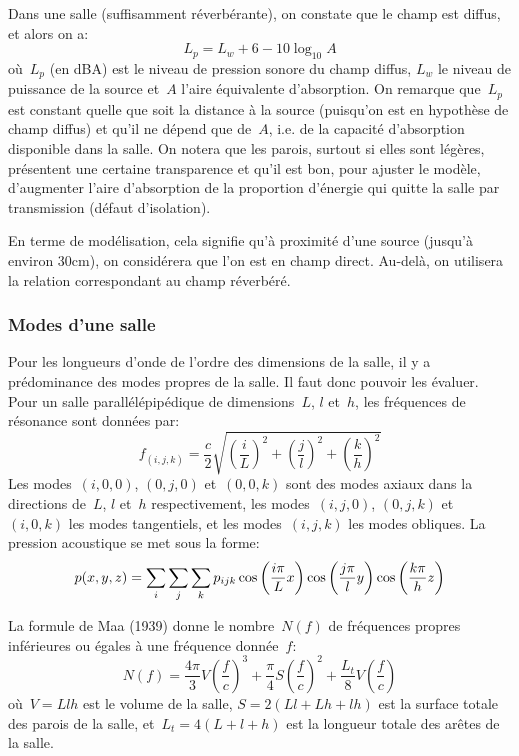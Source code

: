 \medskip
Dans une salle (suffisamment réverbérante), on constate que le champ est diffus, et alors on a:
\begin{equation}
L_p = L_w + 6 - 10\log_{10} A
\end{equation}
où~$L_p$ (en dBA) est le niveau de pression sonore du champ diffus, $L_w$ le niveau de puissance de la source et~$A$ l'aire équivalente d'absorption.
On remarque que~$L_p$ est constant quelle que soit la distance à la source (puisqu'on est en hypothèse de champ diffus) et qu'il ne dépend que de~$A$, i.e. de la capacité d'absorption disponible dans la salle.
On notera que les parois, surtout si elles sont légères, présentent une certaine transparence et qu'il est bon, pour ajuster le modèle, d'augmenter l'aire d'absorption de la proportion d'énergie qui quitte la salle par transmission (défaut d'isolation).

\medskip
En terme de modélisation, cela signifie qu'à proximité d'une source (jusqu'à environ 30cm), on considérera que l'on est en champ direct. Au-delà, on utilisera la relation correspondant au champ réverbéré.



\medskip
\subsubsection{Modes d'une salle}

Pour les longueurs d'onde de l'ordre des dimensions de la salle, il y a prédominance des modes propres de la salle. Il faut donc pouvoir les évaluer.
Pour un salle parallélépipédique de dimensions~$L$, $l$ et~$h$, les fréquences de résonance sont données par:
\begin{equation}
f_{(i,j,k)} = \frac{c}2\sqrt{\left(\frac{i}{L}\right)^2+\left(\frac{j}{l}\right)^2+\left(\frac{k}{h}\right)^2}
\end{equation}
Les modes~$(i,0,0)$, $(0,j,0)$ et~$(0,0,k)$ sont des modes axiaux dans la directions de~$L$, $l$ et~$h$ respectivement, les modes~$(i,j,0)$, $(0,j,k)$ et~$(i,0,k)$ les modes tangentiels, et les modes~$(i,j,k)$ les modes obliques.
La pression acoustique se met sous la forme:
\begin{equation}
p(x,y,z) = \displaystyle\sum_i\displaystyle\sum_j\displaystyle\sum_k p_{ijk}\cos\left(\frac{i\pi}{L}x\right)\cos\left(\frac{j\pi}{l}y\right)\cos\left(\frac{k\pi}{h}z\right)
\end{equation}

La formule de Maa (1939) donne le nombre~$N(f)$ de fréquences propres inférieures ou égales à une fréquence donnée~$f$:
\begin{equation}
N(f) = \frac{4\pi}{3}V\left(\frac{f}{c}\right)^3 + \frac{\pi}{4}S\left(\frac{f}{c}\right)^2 + \frac{L_t}{8}V\left(\frac{f}{c}\right)
\end{equation}
où~$V=Llh$ est le volume de la salle, $S=2(Ll+Lh+lh)$ est la surface totale des parois de la salle, et~$L_t=4(L+l+h)$ est la longueur totale des arêtes de la salle.

